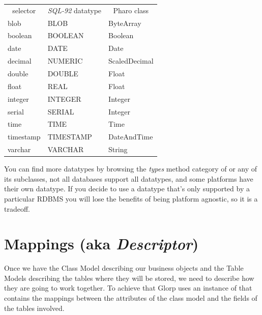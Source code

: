\documentclass[10pt,twoside,english]{_support/latex/sbabook/sbabook}
\begin{document}
\begin{tabular}{lll}
\toprule
\multicolumn{1}{c}{selector} & \multicolumn{1}{c}{\textit{SQL-92} datatype} & \multicolumn{1}{c}{Pharo class} \\
\multicolumn{1}{l}{blob} & \multicolumn{1}{l}{BLOB} & \multicolumn{1}{l}{ByteArray} \\
\multicolumn{1}{l}{boolean} & \multicolumn{1}{l}{BOOLEAN} & \multicolumn{1}{l}{Boolean} \\
\multicolumn{1}{l}{date} & \multicolumn{1}{l}{DATE} & \multicolumn{1}{l}{Date} \\
\multicolumn{1}{l}{decimal} & \multicolumn{1}{l}{NUMERIC} & \multicolumn{1}{l}{ScaledDecimal} \\
\multicolumn{1}{l}{double} & \multicolumn{1}{l}{DOUBLE} & \multicolumn{1}{l}{Float} \\
\multicolumn{1}{l}{float} & \multicolumn{1}{l}{REAL} & \multicolumn{1}{l}{Float} \\
\multicolumn{1}{l}{integer} & \multicolumn{1}{l}{INTEGER} & \multicolumn{1}{l}{Integer} \\
\multicolumn{1}{l}{serial} & \multicolumn{1}{l}{SERIAL} & \multicolumn{1}{l}{Integer} \\
\multicolumn{1}{l}{time} & \multicolumn{1}{l}{TIME} & \multicolumn{1}{l}{Time} \\
\multicolumn{1}{l}{timestamp} & \multicolumn{1}{l}{TIMESTAMP} & \multicolumn{1}{l}{DateAndTime} \\
\multicolumn{1}{l}{varchar} & \multicolumn{1}{l}{VARCHAR} & \multicolumn{1}{l}{String} \\
\bottomrule
\end{tabular}

You can find more datatypes by browsing the \textit{types} method category of
 or any of its subclasses, not all databases support all
datatypes, and some platforms have their own datatype. If you decide to use
a datatype that's only supported by a particular RDBMS you will lose the
benefits of being platform agnostic, so it is a tradeoff.
\section{Mappings (aka \textit{Descriptor})}
Once we have the Class Model describing our business objects and the
Table Models describing the tables where they will be stored, we need to
describe how they are going to work together. To achieve that Glorp uses
an instance of  that contains the mappings between the attributes
of the class model and the fields of the tables involved.
\end{document}
